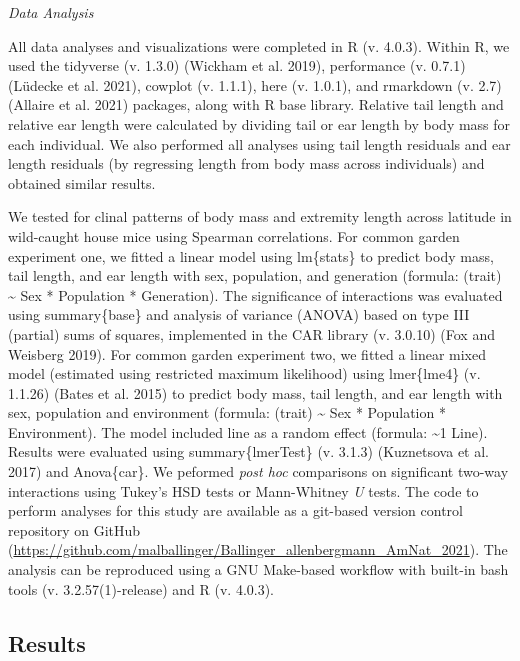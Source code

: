 \documentclass[]{article}
\begin{document}
\vspace{3.5mm}

\noindent\emph{Data Analysis}

All data analyses and visualizations were completed in R (v. 4.0.3).
Within R, we used the tidyverse (v. 1.3.0) (Wickham et al. 2019),
performance (v. 0.7.1) (Lüdecke et al. 2021), cowplot (v. 1.1.1), here
(v. 1.0.1), and rmarkdown (v. 2.7) (Allaire et al. 2021) packages, along
with R base library. Relative tail length and relative ear length were
calculated by dividing tail or ear length by body mass for each
individual. We also performed all analyses using tail length residuals
and ear length residuals (by regressing length from body mass across
individuals) and obtained similar results.

We tested for clinal patterns of body mass and extremity length across
latitude in wild-caught house mice using Spearman correlations. For
common garden experiment one, we fitted a linear model using lm\{stats\}
to predict body mass, tail length, and ear length with sex, population,
and generation (formula: (trait) \textasciitilde{} Sex * Population *
Generation). The significance of interactions was evaluated using
summary\{base\} and analysis of variance (ANOVA) based on type III
(partial) sums of squares, implemented in the CAR library (v. 3.0.10)
(Fox and Weisberg 2019). For common garden experiment two, we fitted a
linear mixed model (estimated using restricted maximum likelihood) using
lmer\{lme4\} (v. 1.1.26) (Bates et al. 2015) to predict body mass, tail
length, and ear length with sex, population and environment (formula:
(trait) \textasciitilde{} Sex * Population * Environment). The model
included line as a random effect (formula: \textasciitilde{}1 \textbar{}
Line). Results were evaluated using summary\{lmerTest\} (v. 3.1.3)
(Kuznetsova et al. 2017) and Anova\{car\}. We peformed \emph{post hoc}
comparisons on significant two-way interactions using Tukey's HSD tests
or Mann-Whitney \emph{U} tests. The code to perform analyses for this
study are available as a git-based version control repository on GitHub
(\url{https://github.com/malballinger/Ballinger_allenbergmann_AmNat_2021}).
The analysis can be reproduced using a GNU Make-based workflow with
built-in bash tools (v. 3.2.57(1)-release) and R (v. 4.0.3).

\vspace{5mm}

\hypertarget{results}{%
\subsection{Results}\label{results}}
\end{document}
